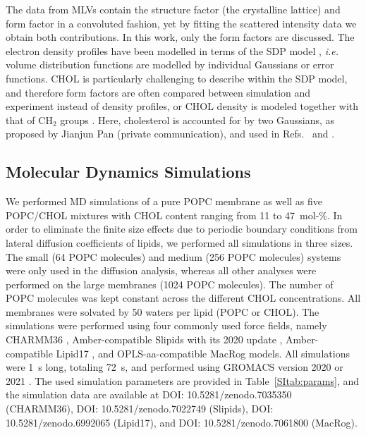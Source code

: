 \documentclass[journal=jctcce]{achemso}
\begin{document}
The data from MLVs contain the structure factor (the crystalline lattice) and form factor in a convoluted fashion, yet by fitting the scattered intensity data we obtain both contributions. In this work, only the form factors are discussed. The electron density profiles have been modelled in terms of the SDP model \cite{heberle12,Kucerka08a,kucerka12}, \textit{i.e.} volume distribution functions are modelled by individual Gaussians or error functions. CHOL is particularly challenging to describe within the SDP model, and therefore form factors are often compared between simulation and experiment \cite{Kucerka08b} instead of density profiles, or CHOL density is modeled together with that of CH$_2$ groups \cite{pan12}. Here, cholesterol is accounted for by two Gaussians, as proposed by Jianjun Pan (private communication), and used in Refs.~ and . 

\subsection{Molecular Dynamics Simulations}

We performed MD simulations of a pure POPC membrane as well as five POPC/CHOL mixtures with CHOL content ranging from 11 to 47~mol-\%. In order to eliminate the finite size effects due to periodic boundary conditions from lateral diffusion coefficients of lipids, we performed all simulations in three sizes. The small (64 POPC molecules) and medium (256 POPC molecules) systems were only used in the diffusion analysis, whereas all other analyses were performed on the large membranes (1024 POPC molecules). The number of POPC molecules was kept constant across the different CHOL concentrations. All membranes were solvated by 50 waters per lipid (POPC or CHOL). The simulations were performed using four commonly used force fields, namely CHARMM36 \cite{Klauda06,lim12}, Amber-compatible Slipids \cite{jambeck12,jambeck12b,jambeck13b} with its 2020 update \cite{grote2020optimization}, Amber-compatible Lipid17 \cite{dickson14,madej15}, and OPLS-aa-compatible MacRog \cite{kulig14,kulig15,Kulig15b} models. All simulations were 1~\textmu{}s long, totaling 72~\textmu{}s, and performed using GROMACS version 2020 or 2021 \cite{pall2020heterogeneous}. The used simulation parameters are provided in Table~\ref{SItab:params}, and the simulation data are available at DOI: 10.5281/zenodo.7035350 (CHARMM36), DOI: 10.5281/zenodo.7022749 (Slipids), DOI: 10.5281/zenodo.6992065 (Lipid17), and DOI: 10.5281/zenodo.7061800 (MacRog).
\end{document}
